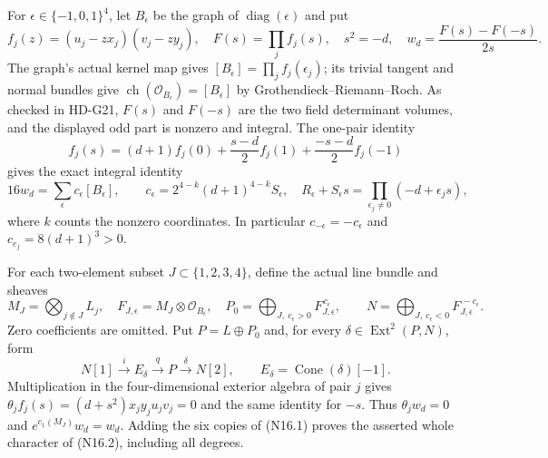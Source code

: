 For $\epsilon\in\{-1,0,1\}^4$, let $B_\epsilon$ be the graph of
$\operatorname{diag}(\epsilon)$ and put
\[
 f_j(z)=(u_j-zx_j)(v_j-zy_j),\quad
 F(s)=\prod_j f_j(s),\quad s^2=-d,\quad
 w_d=\frac{F(s)-F(-s)}{2s}.
\]
The graph's actual kernel map gives
$[B_\epsilon]=\prod_j f_j(\epsilon_j)$; its trivial tangent and
normal bundles give
$\operatorname{ch}(\mathcal O_{B_\epsilon})=[B_\epsilon]$ by
Grothendieck--Riemann--Roch. As checked in HD-G21, $F(s)$ and $F(-s)$
are the two field determinant volumes, and the displayed odd part
is nonzero and integral. The one-pair identity
\[
 f_j(s)=(d+1)f_j(0)+\frac{s-d}{2}f_j(1)
                              +\frac{-s-d}{2}f_j(-1)
\]
gives the exact integral identity
\begin{equation}
 16w_d=\sum_\epsilon c_\epsilon[B_\epsilon],\qquad
 c_\epsilon=2^{4-k}(d+1)^{4-k}S_\epsilon,
 \quad R_\epsilon+S_\epsilon s
        =\prod_{\epsilon_j\ne0}(-d+\epsilon_js),       \tag{N16.1}
\end{equation}
where $k$ counts the nonzero coordinates. In particular
$c_{-\epsilon}=-c_\epsilon$ and
$c_{e_j}=8(d+1)^3>0$.

For each two-element subset $J\subset\{1,2,3,4\}$, define the
actual line bundle and sheaves
\[
 M_J=\bigotimes_{j\notin J}L_j,\quad
 F_{J,\epsilon}=M_J\otimes\mathcal O_{B_\epsilon},\quad
 P_0=\bigoplus_{J,\ c_\epsilon>0}F_{J,\epsilon}^{\,c_\epsilon},
 \qquad
 N=\bigoplus_{J,\ c_\epsilon<0}F_{J,\epsilon}^{\,-c_\epsilon}.
\]
Zero coefficients are omitted. Put $P=L\oplus P_0$ and, for every
$\delta\in\operatorname{Ext}^2(P,N)$, form
\begin{equation}
 N[1]\xrightarrow{i}E_\delta\xrightarrow{q}P
                  \xrightarrow{\delta}N[2],
 \qquad E_\delta=\operatorname{Cone}(\delta)[-1].       \tag{N16.2}
\end{equation}
Multiplication in the four-dimensional exterior algebra of pair $j$
gives $\theta_j f_j(s)=(d+s^2)x_jy_ju_jv_j=0$ and the same
identity for $-s$. Thus $\theta_jw_d=0$ and
$e^{c_1(M_J)}w_d=w_d$. Adding the six copies of (N16.1) proves
the asserted whole character of (N16.2), including all degrees.

